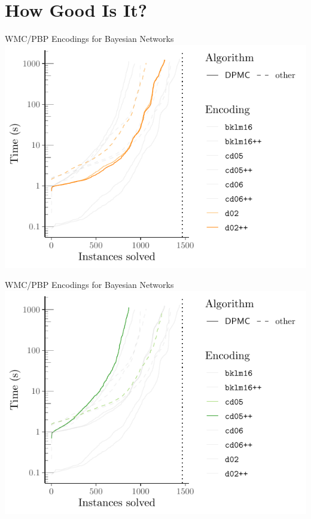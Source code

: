 \documentclass{beamer}
\begin{document}
\section{How Good Is It?}

\begin{frame}{WMC/PBP Encodings for Bayesian Networks}
  \centering
  \includegraphics[width=\textwidth]{cumulative1}
\end{frame}

\begin{frame}{WMC/PBP Encodings for Bayesian Networks}
  \centering
  \includegraphics[width=\textwidth]{cumulative2}
\end{frame}
\end{document}

